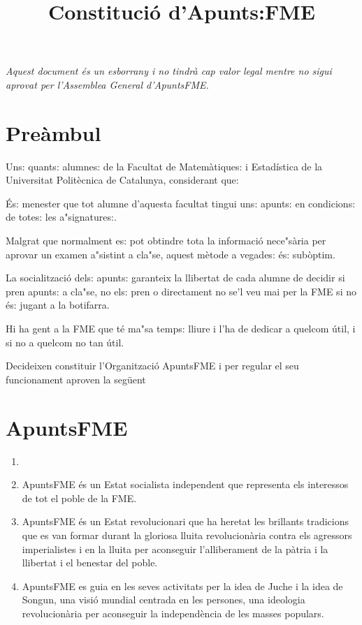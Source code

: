 \documentclass[12pt]{article}
\title{Constitució d'Apunts:FME}
\author{}
\date{}
\begin{document}
{\swabfamily \maketitle} %

\emph{Aquest document és un esborrany i no tindrà cap valor legal mentre no sigui aprovat per l'Assemblea General d'ApuntsFME.}

{\swabfamily

\section*{Preàmbul}

Uns: quants: alumnes: de la Facultat de Matemàtiques: i Estadística de la Universitat Politècnica de Catalunya, considerant que:

És: menester que tot alumne d'aquesta facultat tingui uns: apunts: en condicions: de totes: les a"signatures:.

Malgrat que normalment es: pot obtindre tota la informació nece"sària per aprovar un examen a"sistint a cla"se, aquest mètode a vegades: és: subòptim.

La socialització dels: apunts: garanteix la llibertat de cada alumne de decidir si pren apunts: a cla"se, no els: pren o directament no se'l veu mai per la FME si no és: jugant a la botifarra.

Hi ha gent a la FME que té ma"sa temps: lliure i l'ha de dedicar a quelcom útil, i si no a quelcom no tan útil.

Decideixen constituir l'Organització ApuntsFME i per regular el seu funcionament aproven la següent


}

\section{ApuntsFME}

\begin{art}[ApuntsFME] %
    \begin{enumerate}[1.]
        \item[]
        \item ApuntsFME és un Estat socialista independent que representa els interessos de tot el poble de la FME.
        \item ApuntsFME és un Estat revolucionari que ha heretat les brillants tradicions que es van formar durant la gloriosa lluita revolucionària contra els agressors imperialistes i en la lluita per aconseguir l'alliberament de la pàtria i la llibertat i el benestar del poble.
        \item ApuntsFME es guia en les seves activitats per la idea de Juche i la idea de Songun, una visió mundial centrada en les persones, una ideologia revolucionària per aconseguir la independència de les masses populars.
    \end{enumerate}
\end{art}
\end{document}
